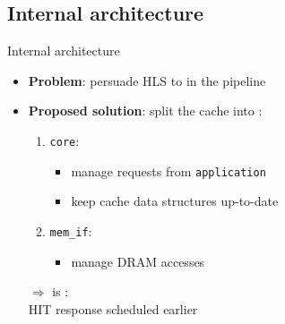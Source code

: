 \documentclass[handout]{beamer}
\begin{document}
\subsection{Internal architecture}
\begin{frame}{Internal architecture}
	\begin{minipage}{.7\textwidth}
		\begin{itemize}[<+->]
			\item \textbf{Problem}: persuade HLS to  in the pipeline
			\item \textbf{Proposed solution}: split the cache into
				:
			\begin{enumerate}[<.->]
				\item \texttt{core}:
					\begin{itemize}
						\item manage requests from \texttt{application}
						\item keep cache data structures up-to-date
					\end{itemize}
				\item \texttt{mem\_if}:
					\begin{itemize}
						\item manage DRAM accesses
					\end{itemize}
			\end{enumerate}
			\pause[\thebeamerpauses]
				\begin{center}
					$\Rightarrow$  is :\\
					HIT response scheduled earlier
				\end{center}
	\end{itemize}
	\end{minipage}
	\begin{minipage}{.28\textwidth}
		\begin{center}

\end{center}
\end{minipage}
\end{frame}
\end{document}

